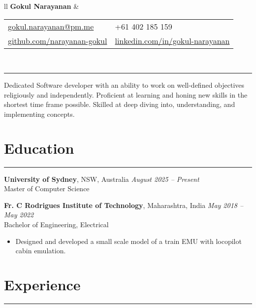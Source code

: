 \documentclass[11pt]{article}
\begin{document}
\begin{tabularx}{\textwidth}{ll}
	{\LARGE \textbf{Gokul Narayanan}} &
	\begin{tabular}{@{}ll}
		\href{mailto:gokul.narayanan@pm.me}{gokul.narayanan@pm.me}
		& +61 402 185 159 \\
		\href{https://github.com/narayanan-gokul}
		{github.com/narayanan-gokul} &
		\href{https://www.linkedin.com/in/gokul-narayanan-5a7681210/}
		{linkedin.com/in/gokul-narayanan} \\
	\end{tabular} \\
\end{tabularx}

\vspace{0.5em}
\rule{\textwidth}{2pt}

Dedicated Software developer with an ability to work on well-defined objectives
religiously and independently. Proficient at learning and honing new skills in
the shortest time frame possible. Skilled at deep diving into, understanding,
and implementing concepts.

\vspace{-0.5\baselineskip}
\section*{Education}
\hrule

\textbf{University of Sydney}, NSW, Australia \hfill \textit{August 2025 -- Present} \\
Master of Computer Science \\

\vspace{-1\baselineskip}

\textbf{Fr. C Rodrigues Institute of Technology}, Maharashtra, India
\hfill \textit{May 2018 -- May 2022} \\
Bachelor of Engineering, Electrical \\
\vspace{-1.5\baselineskip}
\begin{itemize}[topsep=0pt, itemsep=0pt, partopsep=0pt, label=--]
	\item Designed and developed a small scale model of a train EMU with
		locopilot cabin emulation.
\end{itemize}

\vspace{-0.5\baselineskip}
\section*{Experience}
\hrule
\end{document}
